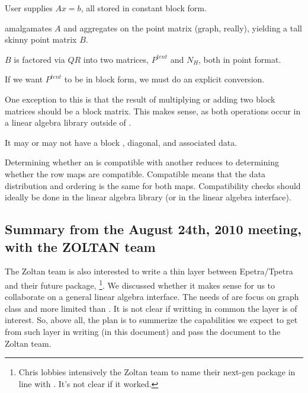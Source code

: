   \be
    \item User supplies $Ax=b$, all stored in constant block form.
    \item \mloo amalgamates $A$ and aggregates on the point matrix (graph, really), yielding a tall skinny point matrix
    $B$.
    \item $B$ is factored via $QR$ into two matrices, $P^{tent}$ and $N_H$, both in point format.
    \item If we want $P^{tent}$ to be in block form, we must do an explicit conversion.
    \item {}
  \ee

  One exception to this is that the result of multiplying or adding two block matrices should be a block matrix.  This
  makes sense, as both operations occur in a linear algebra library outside of \mloo.

  \item It may or may not have a block \getrow, \block diagonal, and associated data.

  \item Determining whether an \operator is compatible with another \operator reduces to determining whether the row maps
  are compatible.  Compatible means that the data distribution and ordering is the same for both maps.  Compatibility
  checks should ideally be done in the linear algebra library (or in the linear algebra interface).

\ee

\MeetingSummary
\subsection{Summary from the August 24th, 2010 meeting, with the ZOLTAN team}

The Zoltan team is also interested to write a thin layer between Epetra/Tpetra and their future package, \zulu\footnote{Chris lobbies intensively the Zoltan team to name their next-gen package in line with \mulu. It's not clear if it worked.}.
We discussed whether it makes sense for us to collaborate on a general linear algebra interface. The needs of \zulu are focus on graph class and more limited than \mulu. 
It is not clear if writting in common the layer is of interest. So, above all, the plan is to summerize the capabilities we expect to get from such layer in writing (in this document) and pass the document to the Zoltan team.

